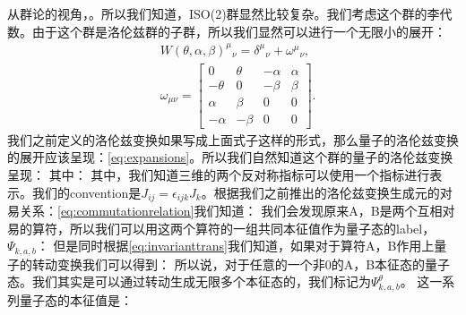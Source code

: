 从群论的视角，。所以我们知道，ISO(2)群显然比较复杂。我们考虑这个群的李代数。由于这个群是洛伦兹群的子群，所以我们显然可以进行一个无限小的展开：
\begin{equation}
\begin{aligned}
    &W(\theta,\alpha,\beta)^{\mu}{}_{\nu} = \delta^{\mu}{}_{\nu} + \omega^{\mu}{}_{\nu}, \\
    &\omega_{\mu\nu} = 
    \begin{bmatrix}
        0 & \theta & -\alpha & \alpha \\
        -\theta & 0 & -\beta & \beta \\
        \alpha & \beta & 0 & 0 \\
        -\alpha & -\beta & 0 & 0
    \end{bmatrix}.
\end{aligned}
\end{equation}
我们之前定义的洛伦兹变换如果写成上面式子这样的形式，那么量子的洛伦兹变换的展开应该呈现：\cref{eq:expansions}。所以我们自然知道这个群的量子的洛伦兹变换呈现：
其中：
其中，我们知道三维的两个反对称指标可以使用一个指标进行表示。我们的convention是$ J_{ij} = \epsilon_{ijk}J_k $。根据我们之前推出的洛伦兹变换生成元的对易关系：\cref{eq:commutationrelation}我们知道： 
我们会发现原来A，B是两个互相对易的算符，所以我们可以用这两个算符的一组共同本征值作为量子态的label，$ \Psi_{k,a,b} $：
但是同时根据\cref{eq:invarianttrans}我们知道，如果对于算符A，B作用上量子的转动变换我们可以得到：
所以说，对于任意的一个非0的A，B本征态的量子态。我们其实是可以通过转动生成无限多个本征态的，我们标记为$ \Psi^\theta_{k,a,b} $。 这一系列量子态的本征值是：
